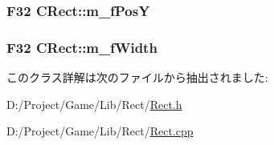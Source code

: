 \subsubsection[{m\+\_\+f\+Pos\+Y}]{\setlength{\rightskip}{0pt plus 5cm}F32 C\+Rect\+::m\+\_\+f\+Pos\+Y\hspace{0.3cm}{\ttfamily [private]}}\label{class_c_rect_a88b075960b04cdee33071c8fddcbe309}
\hypertarget{class_c_rect_acd0d44459fc57787b43b85e457db109e}{}
\subsubsection[{m\+\_\+f\+Width}]{\setlength{\rightskip}{0pt plus 5cm}F32 C\+Rect\+::m\+\_\+f\+Width\hspace{0.3cm}{\ttfamily [private]}}\label{class_c_rect_acd0d44459fc57787b43b85e457db109e}


このクラス詳解は次のファイルから抽出されました\+:\begin{DoxyCompactItemize}
\item 
D\+:/\+Project/\+Game/\+Lib/\+Rect/\hyperlink{_rect_8h}{Rect.\+h}\item 
D\+:/\+Project/\+Game/\+Lib/\+Rect/\hyperlink{_rect_8cpp}{Rect.\+cpp}\end{DoxyCompactItemize}
